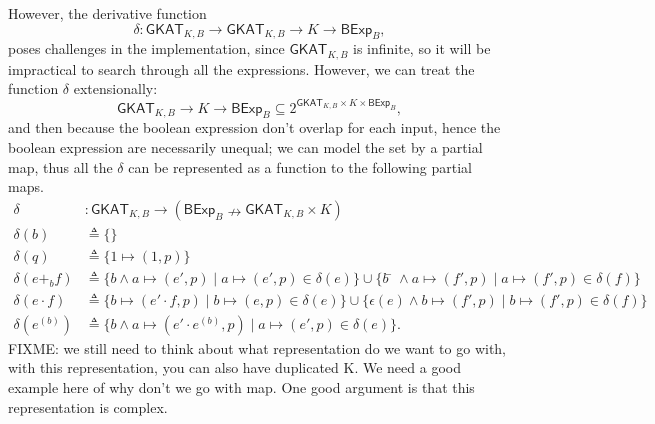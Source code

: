 \documentclass[acmsmall,screen]{acmart}
\newcommand{\theoryOf}[1]{\ensuremath{\mathsf{#1}}}
\newcommand{\GKAT}{\theoryOf{GKAT}}
\newcommand{\BExp}{\theoryOf{BExp}}
\begin{document}
However, the derivative function \[δ: \GKAT_{K, B} → \GKAT_{K, B} → K → \BExp_B,\] poses challenges in the implementation, since \(\GKAT_{K, B}\) is infinite, so it will be impractical to search through all the expressions.
However, we can treat the function \(δ\) extensionally: \[\GKAT_{K, B} → K → \BExp_B ⊆ 2^{\GKAT_{K, B} × K × \BExp_B},\]
and then because the boolean expression don't overlap for each input, hence the boolean expression are necessarily unequal; 
we can model the set by a partial map, thus all the \(δ\) can be represented as a function to the following partial maps.
\begin{align*}
    δ & : \GKAT_{K, B} → (\BExp_B ↛ \GKAT_{K, B} × K) \\
    δ(b) & ≜ \{\} \\
    δ(q) & ≜ \{1 ↦ (1, p)\}\\  
    δ(e +_b f) & ≜ \{b ∧ a ↦ (e', p) ∣ a ↦ (e', p) ∈ δ(e)\} 
        ∪ \{b̄ ∧ a ↦ (f', p) ∣ a ↦ (f', p) ∈ δ(f)\}\\
    δ(e ⋅ f) & ≜ \{b ↦ (e' ⋅ f, p) ∣ b ↦ (e, p) ∈ δ(e)\}
        ∪ \{ϵ(e) ∧ b ↦ (f', p) ∣ b ↦ (f', p) ∈ δ(f)\}\\
    δ(e^{(b)}) & ≜ \{b ∧ a ↦ (e' ⋅ e^{(b)}, p) ∣ a ↦ (e', p) ∈ δ(e)\}.
\end{align*}
FIXME: we still need to think about what representation do we want to go with, with this representation, you can also have duplicated K. We need a good example here of why don't we go with map. One good argument is that this representation is complex.




\end{document}
